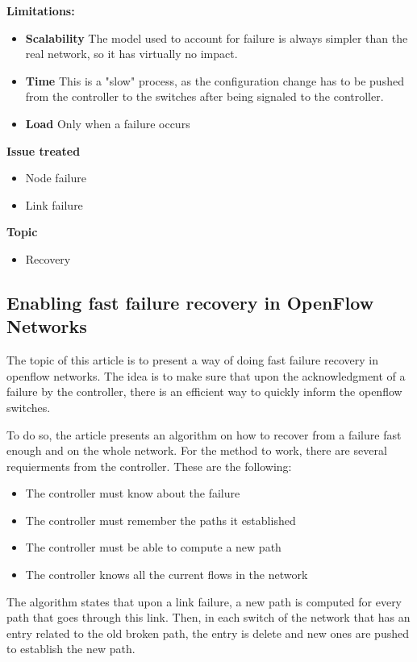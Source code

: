\documentclass[compsoc]{IEEEtran}
\begin{document}
\textbf{Limitations:}
\begin{itemize}
	\item \textbf{Scalability} The model used to account for failure is always simpler than the real network, so it has virtually no impact.
	\item \textbf{Time} This is a "slow" process, as the configuration change has to be pushed from the controller to the switches after being signaled to the controller.
	\item \textbf{Load} Only when a failure occurs
\end{itemize}

\textbf{Issue treated}
\begin{itemize}
	\item Node failure
	\item Link failure
\end{itemize}

\textbf{Topic}
\begin{itemize}
	\item Recovery
\end{itemize}

\subsection{Enabling fast failure recovery in OpenFlow Networks \cite{2911632}}
The topic of this article is to present a way of doing fast failure recovery in openflow networks.
The idea is to make sure that upon the acknowledgment of a failure by the controller, there is an efficient way to quickly inform the openflow switches.

To do so, the article presents an algorithm on how to recover from a failure fast enough and on the whole network.
For the method to work, there are several requierments from the controller. These are the following:
\begin{itemize}
	\item The controller must know about the failure
	\item The controller must remember the paths it established
	\item The controller must be able to compute a new path
	\item The controller knows all the current flows in the network
\end{itemize}
The algorithm states that upon a link failure, a new path is computed for every path that goes through this link.
Then, in each switch of the network that has an entry related to the old broken path, the entry is delete and new ones are pushed to establish the new path.
\end{document}
